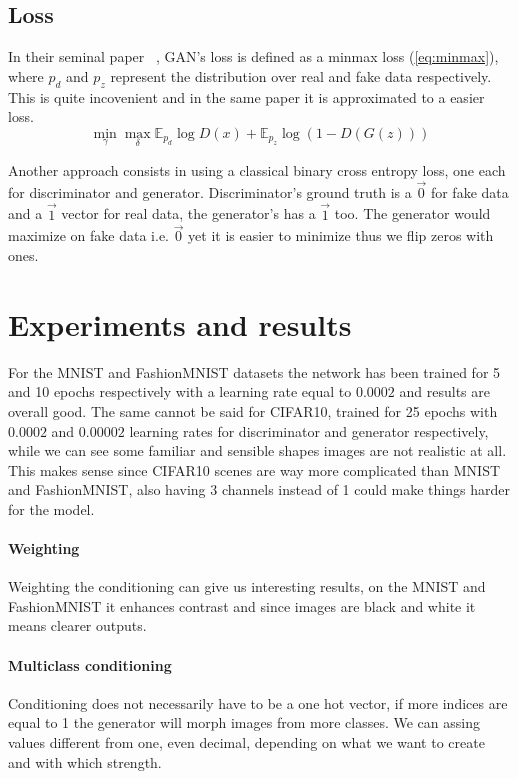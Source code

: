 \documentclass[10pt,twocolumn,letterpaper]{article}
\begin{document}
\subsection{Loss}
In their seminal paper ~\cite{goodfellow2014generative}, GAN's loss is defined as a minmax loss (\ref{eq:minmax}), where $p_d$ and $p_z$ represent the distribution over real and fake data respectively.
This is quite incovenient and in the same paper it is approximated to a easier loss.
\begin{equation}
   \label{eq:minmax}
   \min_\gamma \max_\delta \mathbb{E}_{p_d} \log D(x) + \mathbb{E}_{p_z} \log (1-D(G(z)))
\end{equation}

Another approach consists in using a classical binary cross entropy loss, one each for discriminator and generator.
Discriminator's ground truth is a $\vec{0}$ for fake data and a $\vec{1}$ vector for real data, the generator's has a $\vec{1}$ too.
The generator would maximize on fake data i.e. $\vec{0}$ yet it is easier to minimize thus we flip zeros with ones.

\section{Experiments and results}
For the MNIST and FashionMNIST datasets the network has been trained for 5 and 10 epochs respectively with a learning rate equal to $0.0002$ and results are overall good.
The same cannot be said for CIFAR10, trained for 25 epochs with $0.0002$ and $0.00002$ learning rates for discriminator and generator respectively, while we can see some familiar and sensible shapes images are not realistic at all.
This makes sense since CIFAR10 scenes are way more complicated than MNIST and FashionMNIST, also having 3 channels instead of 1 could make things harder for the model.

\paragraph{Weighting}
Weighting the conditioning can give us interesting results, on the MNIST and FashionMNIST it enhances contrast and since images are black and white it means clearer outputs.

\paragraph{Multiclass conditioning}
Conditioning does not necessarily have to be a one hot vector, if more indices are equal to 1 the generator will morph images from more classes.
We can assing values different from one, even decimal, depending on what we want to create and with which strength.
\end{document}
